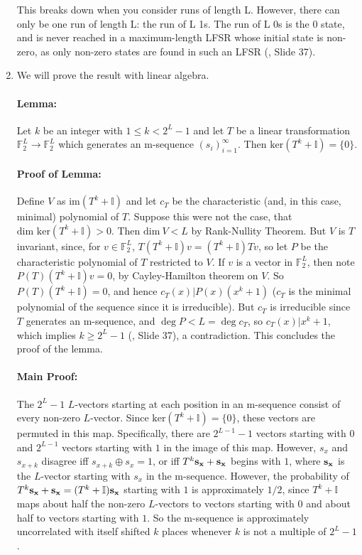 \begin{enumerate}
This breaks down when you consider runs of length L. However, there can only be
one run of length L: the run of L 1s. The run of L 0s is the 0 state, and is
never reached in a maximum-length LFSR whose initial state is non-zero, as only
non-zero states are found in such an LFSR (\cite{slides}, Slide 37).

\item We will prove the result with linear algebra.

\paragraph{Lemma:} Let $k$ be an integer with $1 \le k < 2^L-1$ and let $T$
be a linear transformation $\mathbb{F}^L_2 \to \mathbb{F}^L_2$ which
generates an m-sequence $(s_i)_{i=1}^\infty$. Then $\text{ker}(T^k+\mathbb{I})=\{0\}$.

\paragraph{Proof of Lemma:} Define $V$ as $\text{im}(T^k+\mathbb{I})$ and let
$c_T$ be the characteristic (and, in this case, minimal) polynomial of $T$.
Suppose this were not the case, that
$\text{dim ker}(T^k+\mathbb{I})>0$. Then $\text{dim}\ V<L$ by Rank-Nullity Theorem.
But $V$ is $T$ invariant, since, for $v \in \mathbb{F}_2^L$,
$T(T^k+\mathbb{I})v=(T^k+\mathbb{I})Tv$,
so let $P$ be the characteristic polynomial of $T$ restricted to $V$.
If $v$ is a vector in $\mathbb{F}^L_2$, then note $P(T)(T^k+\mathbb{I})v=0$,
by Cayley-Hamilton theorem on $V$. So $P(T)(T^k+\mathbb{I})=0$, and hence
$c_T(x) | P(x)(x^k+1)$ ($c_T$ is the minimal polynomial of the sequence
since it is irreducible). But $c_T$ is irreducible since $T$ generates an
m-sequence, and $\deg P<L=\deg c_T$, so $c_T(x) | x^k+1$, which implies
$k\ge 2^L-1$ (\cite{slides}, Slide 37), a contradiction. This concludes
the proof of the lemma.

\paragraph{Main Proof:} The $2^L-1$ $L$-vectors starting at each position
in an m-sequence consist of every non-zero $L$-vector. Since 
$\text{ker}(T^k+\mathbb{I})=\{0\}$, these vectors are permuted in this map.
Specifically, there are $2^{L-1}-1$ vectors starting with $0$ and $2^{L-1}$ vectors
starting with $1$ in the image of this map. However, $s_x$ and $s_{x+k}$
disagree iff $s_{x+k}\oplus s_x=1$, or iff $T^k{\bf s_x}+{\bf s_x}$ begins with
$1$, where ${\bf s_x}$ is the $L$-vector starting with $s_x$ in the m-sequence.
However, the probability of $T^k{\bf s_x}+{\bf s_x}=(T^k+\mathbb{I}){\bf s_x}$
starting with $1$ is approximately $1/2$, since $T^k+\mathbb{I}$ maps about half the non-zero
$L$-vectors to vectors starting with $0$ and about half to vectors starting with
$1$. So the m-sequence
is approximately uncorrelated with itself shifted $k$ places whenever $k$ is not
a multiple of $2^L-1$.

\end{enumerate}
